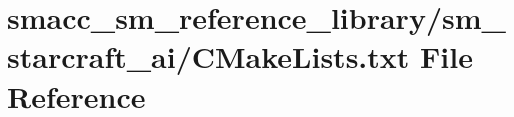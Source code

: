 \hypertarget{sm__reference__library_2sm__starcraft__ai_2CMakeLists_8txt}{}\section{smacc\+\_\+sm\+\_\+reference\+\_\+library/sm\+\_\+starcraft\+\_\+ai/\+C\+Make\+Lists.txt File Reference}
\label{sm__reference__library_2sm__starcraft__ai_2CMakeLists_8txt}
